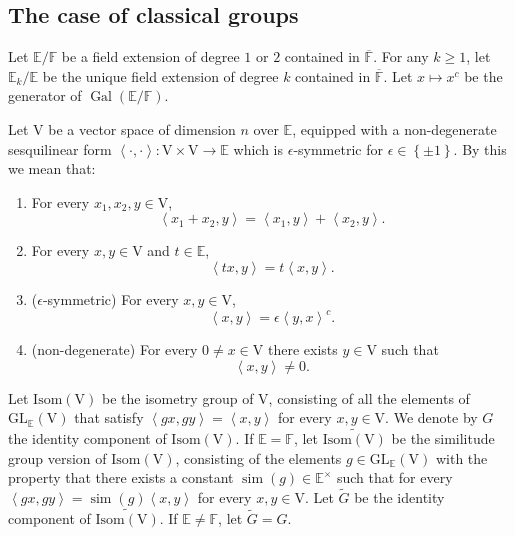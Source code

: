 \documentclass[12pt, reqno]{amsart}
\theoremstyle{definition}
\theoremstyle{definition}
\theoremstyle{definition}
\newcommand{\multiplicativegroup}[1]{#1^{\times}}
\newcommand{\hermitianSpace}{\mathrm{V}}
\newcommand{\similitudeCharacter}{\operatorname{sim}}
\newcommand{\innerproduct}[2]{\left\langle #1,#2\right\rangle}
\newcommand{\involution}[1]{#1^{c}}
\newcommand{\GL}{\mathrm{GL}}
\newcommand{\GroupExtension}[1]{\widetilde{#1}}
\newcommand{\finiteField}{\mathbb{F}}
\newcommand{\quadraticExtension}{\mathbb{E}}
\newcommand{\quadraticFieldExtension}[1]{\quadraticExtension_{#1}}
\newcommand{\algebraicClosure}[1]{\overline{#1}}
\newcommand{\Galois}{\operatorname{Gal}}
\newcommand{\IsometryGroup}{\mathrm{Isom}}
\begin{document}
\subsection{The case of classical groups}

Let $\quadraticExtension \slash \finiteField$ be a field extension of degree $1$ or $2$ contained in $\algebraicClosure{\finiteField}$. For any $k \ge 1$, let $\quadraticFieldExtension{k} \slash \quadraticExtension$ be the unique field extension of degree $k$ contained in $\algebraicClosure{\finiteField}$. Let $x \mapsto \involution{x}$ be the generator of $\Galois\left(\quadraticExtension \slash \finiteField\right)$.

Let $\hermitianSpace$ be a vector space of dimension $n$ over $\quadraticExtension$, equipped with a non-degenerate sesquilinear form $\innerproduct{\cdot}{\cdot} \colon \hermitianSpace \times \hermitianSpace \to \quadraticExtension$ which is $\epsilon$-symmetric for $\epsilon \in \left\{\pm 1\right\}$. By this we mean that:
\begin{enumerate}
	\item For every $x_1,x_2,y \in \hermitianSpace$, $$\innerproduct{x_1 + x_2}{y} = \innerproduct{x_1}{y} + \innerproduct{x_2}{y}.$$
	\item For every $x,y \in \hermitianSpace$ and $t \in \quadraticExtension$, $$\innerproduct{tx}{y} = t\innerproduct{x}{y}.$$
	\item ($\epsilon$-symmetric) For every $x,y \in \hermitianSpace$, $$\innerproduct{x}{y} = \epsilon \involution{\innerproduct{y}{x}}.$$
	\item (non-degenerate) For every $0 \ne x \in \hermitianSpace$ there exists $y \in \hermitianSpace$ such that $$\innerproduct{x}{y} \ne 0.$$
\end{enumerate}
Let $\IsometryGroup \left(\hermitianSpace\right)$ be the isometry group of $\hermitianSpace$, consisting of all the elements of $\GL_{\quadraticExtension}\left(\hermitianSpace\right)$ that satisfy $\innerproduct{gx}{gy} = \innerproduct{x}{y}$ for every $x,y \in \hermitianSpace$. We denote by $G$ the identity component of $\IsometryGroup\left(\hermitianSpace\right)$. If $\quadraticExtension = \finiteField$, let $\GroupExtension{\IsometryGroup\left(\hermitianSpace\right)}$ be the similitude group version of $\IsometryGroup\left(\hermitianSpace\right)$, consisting of the elements $g \in \GL_{\quadraticExtension}\left(\hermitianSpace\right)$ with the property that there exists a constant $\similitudeCharacter\left(g\right) \in \multiplicativegroup{\quadraticExtension}$ such that for every $\innerproduct{gx}{gy} = \similitudeCharacter\left(g\right) \innerproduct{x}{y}$ for every $x,y \in \hermitianSpace$. Let $\GroupExtension{G}$ be the identity component of $\GroupExtension{\IsometryGroup\left(\hermitianSpace\right)}$. If $\quadraticExtension \ne \finiteField$, let $\GroupExtension{G} = G$.
\end{document}
